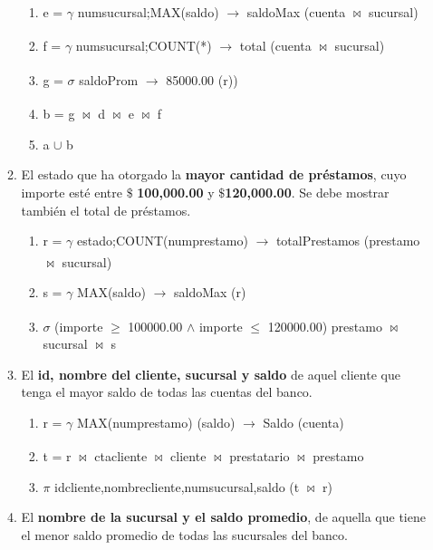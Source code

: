 \documentclass[10pt,letterpaper,fleqn]{article}
\begin{document}
\begin{enumerate}
\begin{enumerate}[a]
\begin{enumerate}[1]
                \item \textbar \quad e = $\gamma$ numsucursal;MAX(saldo) $\xrightarrow[]{}$ saldoMax (cuenta $\bowtie$ sucursal)
                \item \textbar \quad f = $\gamma$ numsucursal;COUNT(*) $\xrightarrow[]{}$ total (cuenta $\bowtie$ sucursal)
                \item \textbar \quad g = $\sigma$ saldoProm $\xrightarrow[]{}$ 85000.00 (r))
                \item \textbar \quad b = g $\bowtie$ d $\bowtie$ e $\bowtie$ f
                \item \textbar \quad a $\cup$ b
            \end{enumerate}
            \item El estado que ha otorgado la \textbf{mayor cantidad de préstamos}, cuyo importe esté entre $\$$ \textbf{100,000.00} y $\$$\textbf{120,000.00}. Se debe mostrar también el total de préstamos.
            \begin{enumerate}[1]
                \item \textbar \quad r = $\gamma$ estado;COUNT(numprestamo) $\xrightarrow[]{}$ totalPrestamos (prestamo $\bowtie$ sucursal)
                \item \textbar \quad s = $\gamma$ MAX(saldo) $\xrightarrow[]{}$ saldoMax (r)
                \item \textbar \quad $\sigma$ (importe $\geq$ 100000.00 $\land$ importe $\leq$ 120000.00) prestamo $\bowtie$ sucursal $\bowtie$ s
            \end{enumerate}
            \item El \textbf{id, nombre del cliente, sucursal y saldo} de aquel cliente que tenga el mayor saldo de todas las cuentas del banco.
            \begin{enumerate}[1]
                \item \textbar \quad r = $\gamma$ MAX(numprestamo) (saldo) $\xrightarrow[]{}$ Saldo (cuenta)
                \item \textbar \quad t = r $\bowtie$ ctacliente $\bowtie$ cliente $\bowtie$ prestatario $\bowtie$ prestamo
                \item \textbar \quad $\pi$ idcliente,nombrecliente,numsucursal,saldo (t $\bowtie$ r)
            \end{enumerate}
            \item El \textbf{nombre de la sucursal y el saldo promedio}, de aquella que tiene el menor saldo promedio de todas las sucursales del banco.

\end{enumerate}
\end{enumerate}
\end{document}
